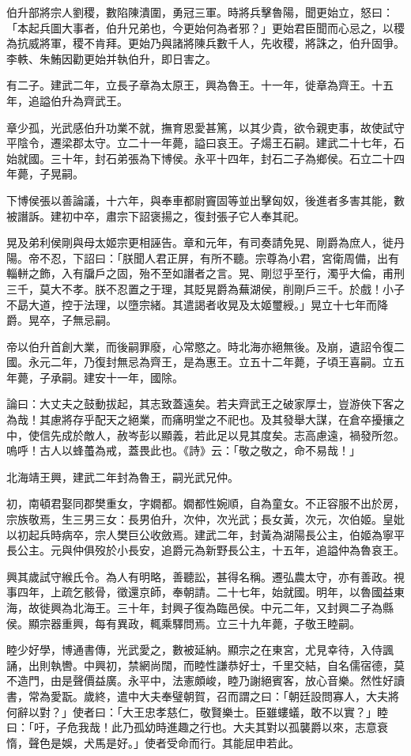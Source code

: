 \begin{pinyinscope}
伯升部將宗人劉稷，數陷陳潰圍，勇冠三軍。時將兵擊魯陽，聞更始立，怒曰：「本起兵圖大事者，伯升兄弟也，今更始何為者邪？」更始君臣聞而心忌之，以稷為抗威將軍，稷不肯拜。更始乃與諸將陳兵數千人，先收稷，將誅之，伯升固爭。李軼、朱鮪因勸更始并執伯升，即日害之。

有二子。建武二年，立長子章為太原王，興為魯王。十一年，徙章為齊王。十五年，追謚伯升為齊武王。

章少孤，光武感伯升功業不就，撫育恩愛甚篤，以其少貴，欲令親吏事，故使試守平陰令，遷梁郡太守。立二十一年薨，謚曰哀王。子煬王石嗣。建武二十七年，石始就國。三十年，封石弟張為下博侯。永平十四年，封石二子為鄉侯。石立二十四年薨，子晃嗣。

下博侯張以善論議，十六年，與奉車都尉竇固等並出擊匈奴，後進者多害其能，數被譖訴。建初中卒，肅宗下詔褒揚之，復封張子它人奉其祀。

晃及弟利侯剛與母太姬宗更相誣告。章和元年，有司奏請免晃、剛爵為庶人，徙丹陽。帝不忍，下詔曰：「朕聞人君正屏，有所不聽。宗尊為小君，宮衛周備，出有輜軿之飾，入有牖戶之固，殆不至如譖者之言。晃、剛愆乎至行，濁乎大倫，甫刑三千，莫大不孝。朕不忍置之于理，其貶晃爵為蕪湖侯，削剛戶三千。於戲！小子不勗大道，控于法理，以墮宗緒。其遣謁者收晃及太姬璽綬。」晃立十七年而降爵。晃卒，子無忌嗣。

帝以伯升首創大業，而後嗣罪廢，心常愍之。時北海亦絕無後。及崩，遺詔令復二國。永元二年，乃復封無忌為齊王，是為惠王。立五十二年薨，子頃王喜嗣。立五年薨，子承嗣。建安十一年，國除。

論曰：大丈夫之鼓動拔起，其志致蓋遠矣。若夫齊武王之破家厚士，豈游俠下客之為哉！其慮將存乎配天之絕業，而痛明堂之不祀也。及其發舉大謀，在倉卒擾攘之中，使信先成於敵人，赦岑彭以顯義，若此足以見其度矣。志高慮遠，禍發所忽。嗚呼！古人以蜂蠆為戒，蓋畏此也。《詩》云：「敬之敬之，命不易哉！」

北海靖王興，建武二年封為魯王，嗣光武兄仲。

初，南頓君娶同郡樊重女，字嫺都。嫺都性婉順，自為童女。不正容服不出於房，宗族敬焉，生三男三女：長男伯升，次仲，次光武；長女黃，次元，次伯姬。皇妣以初起兵時病卒，宗人樊巨公收斂焉。建武二年，封黃為湖陽長公主，伯姬為寧平長公主。元與仲俱歿於小長安，追爵元為新野長公主，十五年，追謚仲為魯哀王。

興其歲試守緱氏令。為人有明略，善聽訟，甚得名稱。遷弘農太守，亦有善政。視事四年，上疏乞骸骨，徵還京師，奉朝請。二十七年，始就國。明年，以魯國益東海，故徙興為北海王。三十年，封興子復為臨邑侯。中元二年，又封興二子為縣侯。顯宗器重興，每有異政，輒乘驛問焉。立三十九年薨，子敬王睦嗣。

睦少好學，博通書傳，光武愛之，數被延納。顯宗之在東宮，尤見幸待，入侍諷誦，出則執轡。中興初，禁網尚闊，而睦性謙恭好士，千里交結，自名儒宿德，莫不造門，由是聲價益廣。永平中，法憲頗峻，睦乃謝絕賓客，放心音樂。然性好讀書，常為愛翫。歲終，遣中大夫奉璧朝賀，召而謂之曰：「朝廷設問寡人，大夫將何辭以對？」使者曰：「大王忠孝慈仁，敬賢樂士。臣雖螻蟻，敢不以實？」睦曰：「吁，子危我哉！此乃孤幼時進趣之行也。大夫其對以孤襲爵以來，志意衰惰，聲色是娛，犬馬是好。」使者受命而行。其能屈申若此。


\end{pinyinscope}
